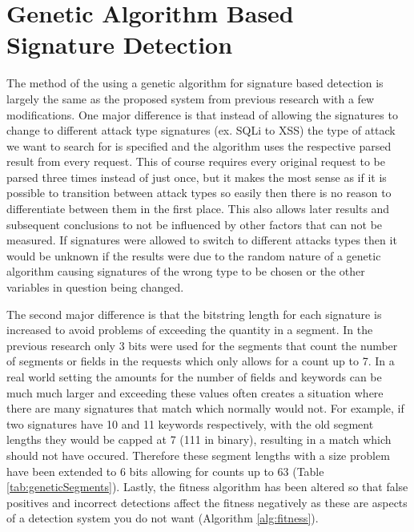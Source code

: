 \section{Genetic Algorithm Based Signature Detection}\label{sec:genIntro}

The method of the using a genetic algorithm for signature based detection is largely the same as the proposed system from previous research with a few modifications. \cite{mainPaper}  One major difference is that instead of allowing the signatures to change to different attack type signatures (ex. SQLi to XSS) the type of attack we want to search for is specified and the algorithm uses the respective parsed result from every request.  This of course requires every original request to be parsed three times instead of just once, but it makes the most sense as if it is possible to transition between attack types so easily then there is no reason to differentiate between them in the first place.  This also allows later results and subsequent conclusions to not be influenced by other factors that can not be measured.  If signatures were allowed to switch to different attacks types then it would be unknown if the results were due to the random nature of a genetic algorithm causing signatures of the wrong type to be chosen or the other variables in question being changed.  

The second major difference is that the bitstring length for each signature is increased to avoid problems of exceeding the quantity in a segment.  In the previous research only 3 bits were used for the segments that count the number of segments or fields in the requests which only allows for a count up to 7.  In a real world setting the amounts for the number of fields and keywords can be much much larger and exceeding these values often creates a situation where there are many signatures that match which normally would not.  For example, if two signatures have 10 and 11 keywords respectively, with the old segment lengths they would be capped at 7  (111 in binary), resulting in a match which should not have occured.  Therefore these segment lengths with a size problem have been extended to 6 bits allowing for counts up to 63 (Table \ref{tab:geneticSegments}).  Lastly, the fitness algorithm has been altered so that false positives and incorrect detections affect the fitness negatively as these are aspects of a detection system you do not want (Algorithm \ref{alg:fitness}).

